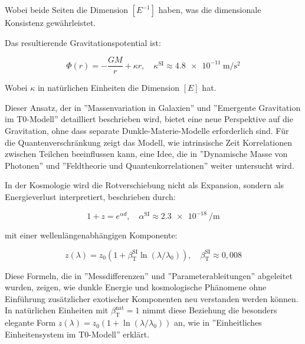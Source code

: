 \documentclass[a4paper,12pt]{article}
\newcommand{\betaT}{\beta_{\text{T}}}
\begin{document}
	Wobei beide Seiten die Dimension \([E^{-1}]\) haben, was die dimensionale Konsistenz gewährleistet.
	
	Das resultierende Gravitationspotential ist:
	
	\begin{equation}
		\Phi(r) = -\frac{G M}{r} + \kappa r, \quad \kappa^{\text{SI}} \approx \SI{4,8e-11}{\meter\per\second\squared}
	\end{equation}
	
	Wobei \(\kappa\) in natürlichen Einheiten die Dimension \([E]\) hat.
	
	Dieser Ansatz, der in ''Massenvariation in Galaxien'' \cite{pascher_galaxies_2025} und ''Emergente Gravitation im T0-Modell'' \cite{pascher_emergente_gravitation_2025} detailliert beschrieben wird, bietet eine neue Perspektive auf die Gravitation, ohne dass separate Dunkle-Materie-Modelle erforderlich sind. Für die Quantenverschränkung zeigt das Modell, wie intrinsische Zeit Korrelationen zwischen Teilchen beeinflussen kann, eine Idee, die in ''Dynamische Masse von Photonen'' \cite{pascher_photons_2025} und ''Feldtheorie und Quantenkorrelationen'' \cite{pascher_feldtheorie_2025} weiter untersucht wird.
	
	In der Kosmologie wird die Rotverschiebung nicht als Expansion, sondern als Energieverlust interpretiert, beschrieben durch:
	
	\begin{equation}
		1 + z = e^{\alpha d}, \quad \alpha^{\text{SI}} \approx \SI{2,3e-18}{\per\meter}
	\end{equation}
	
	mit einer wellenlängenabhängigen Komponente:
	
	\begin{equation}
		z(\lambda) = z_0 (1 + \betaT^{\text{SI}} \ln(\lambda/\lambda_0)), \quad \betaT^{\text{SI}} \approx 0,008
	\end{equation}
	
	Diese Formeln, die in ''Messdifferenzen'' \cite{pascher_messdifferenzen_2025} und ''Parameterableitungen'' \cite{pascher_params_2025} abgeleitet wurden, zeigen, wie dunkle Energie und kosmologische Phänomene ohne Einführung zusätzlicher exotischer Komponenten neu verstanden werden können. In natürlichen Einheiten mit \(\betaT^{\text{nat}} = 1\) nimmt diese Beziehung die besonders elegante Form \(z(\lambda) = z_0 (1 + \ln(\lambda/\lambda_0))\) an, wie in ''Einheitliches Einheitensystem im T0-Modell'' \cite{pascher_alphabeta_2025} erklärt.
	
\end{document}
